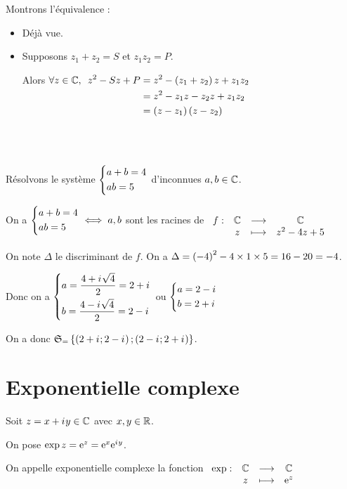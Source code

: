 \begin{dem}
Montrons l'équivalence :

\begin{itemize}
\item[\imprec] Déjà vue.

\item[\impdir] Supposons \(z_1+z_2=S\) et \(z_1z_2=P\).

Alors \(\begin{aligned}[t]
\quantifs{\forall z\in\C}z^2-Sz+P&=z^2-\paren{z_1+z_2}z+z_1z_2 \\
&=z^2-z_1z-z_2z+z_1z_2 \\
&=\paren{z-z_1}\paren{z-z_2}
\end{aligned}\)
\end{itemize}

~
\end{dem}

\begin{ex}~\\
Résolvons le système \(\begin{dcases}a+b=4 \\ ab=5\end{dcases}\) d'inconnues \(a,b\in\mathbb{C}\).

On a \(\begin{dcases}a+b=4 \\ ab=5\end{dcases}\iff a,b\) sont les racines de \(\begin{array}[t]{cccc}f : & \mathbb{C} & \longrightarrow & \mathbb{C} \\ & z & \longmapsto & z^2-4z+5\end{array}\)

On note \(\Delta\) le discriminant de \(f\). On a \(\Delta=\left(-4\right)^2-4\times1\times5=16-20=-4\).

Donc on a \(\begin{dcases}a=\dfrac{4+i\mkern1mu\sqrt{4}}{2}=2+i\mkern1mu \\ b=\dfrac{4-i\mkern1mu\sqrt{4}}{2}=2-i\mkern1mu\end{dcases}\) ou \(\begin{dcases}a=2-i\mkern1mu \\ b=2+i\mkern1mu\end{dcases}\)

On a donc \(\frak{S}_{=}\left\lbrace\left(2+i\mkern1mu;2-i\mkern1mu\right);\left(2-i\mkern1mu;2+i\mkern1mu\right)\right\rbrace\).
\end{ex}

\section{Exponentielle complexe}

\begin{defi}
Soit \(z=x+i\mkern1mu y\in\mathbb{C}\) avec \(x,y\in\mathbb{R}\).

On pose \(\exp z=\mathrm{e}^{z}=\mathrm{e}^{x}\mathrm{e}^{i\mkern1mu y}\).

On appelle exponentielle complexe la fonction \(\begin{array}[t]{cccc}\exp : & \mathbb{C} & \longrightarrow & \mathbb{C} \\ & z & \longmapsto & \mathrm{e}^{z}\end{array}\)
\end{defi}

